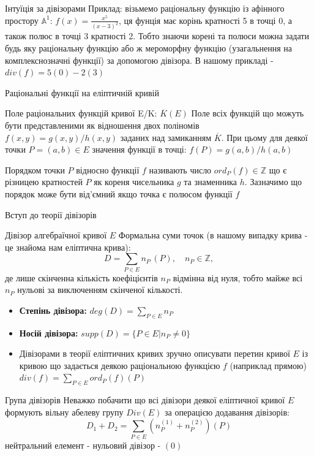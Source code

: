 \documentclass[9pt]{beamer}
\begin{document}
\begin{darkframes}
\begin{frame}{Інтуїція за дівізорами}
    Приклад: візьмемо раціональну функцію із афінного простору $\mathbb{A}^1$: $f(x)=\frac{x^5}{(x-3)^2}$, ця фунція має корінь кратності 5 в точці 0, а також полюс в точці 3 кратності 2. Тобто знаючи корені та полюси можна задати будь яку раціональну функцію або ж мероморфну функцію (узагальнення на комплекснозначні функції) за допомогою дівізора. В нашому прикладі - $div(f) = 5(0) - 2(3)$
\end{frame}

\begin{frame}{Раціональні функції на еліптичній кривій}
    \begin{block}{Поле раціональних функцій кривої E/K: $\overline{K}(E)$}
    Поле всіх функцій що можуть бути представленими як відношення двох поліномів $f(x,y) = g(x,y)/h(x,y)$ заданих над замиканням $\overline{K}$. При цьому для деякої точки  $P=(a,b) \in E$ значення функції в точці: $f(P)=g(a,b)/h(a,b)$
    \end{block}
    Порядком точки $P$ відносно функції $f$ називають число $ord_P(f) \in \mathbb{Z}$ що є різницею кратностей $P$ як кореня чисельника $g$ та знаменника $h$. Зазначимо що порядок може бути від'ємний якщо точка є полюсом функції $f$
\end{frame}
\begin{frame}{Вступ до теорії дівізорів}
  \begin{block}{Дівізор алгебраїчної кривої $E$}
      Формальна суми точок (в нашому випадку крива - це знайома нам еліптична крива):
      \[
      D = \sum_{P \in E} n_P\,(P),\quad n_P \in \mathbb{Z},
      \]
      де лише скінченна кількість коефіцієнтів \(n_P\) відмінна від нуля, тобто майже всі $n_P$ нульові за виключенням скінченої кількості.
      \end{block}
      \begin{itemize}
          
    \item \textbf{Степінь дівізора:} $deg(D) = \sum_{P \in E} n_P$
    \item \textbf{Носій дівізора:} $supp(D) = \{P \in E | n_P \neq 0\}$
    \item Дівізорами в теорії еліптичних кривих зручно описувати перетин кривої $E$ із кривою що задається деякою раціональною функцією $f$ (наприклад прямою) $div(f)=\sum_{P\in E} ord_P(f) (P)$
\end{itemize}
\end{frame}

\begin{frame}{Група дівізорів}
  Неважко побачити що всі дівізори деякої еліптичної кривої $E$ формують вільну абелеву групу $Div(E)$ за операцією додавання дівізорів: $$D_1 + D_2 = \sum_{P\in E} (n_{P}^{(1)} + n_{P}^{(2)})(P) $$
  нейтральний елемент - нульовий дівізор - $(0)$


\end{frame}
\end{darkframes}
\end{document}

